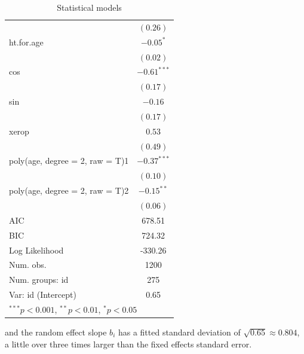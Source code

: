 \documentclass[11pt]{article}
\begin{document}
\begin{enumerate}
\begin{enumerate}
\begin{table}[H]
\begin{center}
\begin{tabular}{l c }
                                & $(0.26)$      \\
ht.for.age                      & $-0.05^{*}$   \\
                                & $(0.02)$      \\
cos                             & $-0.61^{***}$ \\
                                & $(0.17)$      \\
sin                             & $-0.16$       \\
                                & $(0.17)$      \\
xerop                           & $0.53$        \\
                                & $(0.49)$      \\
poly(age, degree = 2, raw = T)1 & $-0.37^{***}$ \\
                                & $(0.10)$      \\
poly(age, degree = 2, raw = T)2 & $-0.15^{**}$  \\
                                & $(0.06)$      \\
\hline
AIC                             & 678.51        \\
BIC                             & 724.32        \\
Log Likelihood                  & -330.26       \\
Num. obs.                       & 1200          \\
Num. groups: id                 & 275           \\
Var: id (Intercept)             & 0.65          \\
\hline
\multicolumn{2}{l}{\scriptsize{$^{***}p<0.001$, $^{**}p<0.01$, $^*p<0.05$}}
\end{tabular}
\caption{Statistical models}
\label{table:coefficients}
\end{center}
\end{table}
			and the random effect slope $b_i$ has a fitted standard deviation of $\sqrt{0.65} \approx 0.804$, a little over three times larger than the fixed effects standard error.

\end{enumerate}
\end{enumerate}
\end{document}
